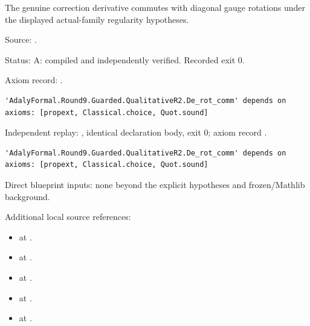 \begin{theorem}[bp-328]
\label{bp-328}
\uses{}
\leanok
The genuine correction derivative commutes with diagonal gauge rotations under the displayed actual-family regularity hypotheses.

\par Source: \texttt{}.
\par Status: A: compiled and independently verified. Recorded exit 0.
\par Axiom record: \texttt{}.
\begin{verbatim}
'AdalyFormal.Round9.Guarded.QualitativeR2.De_rot_comm' depends on axioms: [propext, Classical.choice, Quot.sound]
\end{verbatim}
\par Independent replay: \texttt{}, identical declaration body, exit 0; axiom record \texttt{}.
\begin{verbatim}
'AdalyFormal.Round9.Guarded.QualitativeR2.De_rot_comm' depends on axioms: [propext, Classical.choice, Quot.sound]
\end{verbatim}
\par Direct blueprint inputs: none beyond the explicit hypotheses and frozen/Mathlib background.
\par Additional local source references:
\begin{itemize}
\item \texttt{} at \texttt{}.
\item \texttt{} at \texttt{}.
\item \texttt{} at \texttt{}.
\item \texttt{} at \texttt{}.
\item \texttt{} at \texttt{}.

\end{itemize}
\end{theorem}
